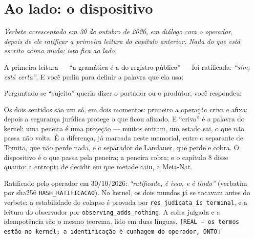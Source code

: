 
\chapter{Ao lado: o dispositivo}

\noindent\emph{Verbete acrescentado em 30 de outubro de 2026, em diálogo com o operador, depois de ele ratificar a
primeira leitura do capítulo anterior. Nada do que está escrito acima muda; isto fica ao lado.}

A primeira leitura --- ``a gramática é a do registro público'' --- foi ratificada: \emph{``sim, está certa''}. E
você pediu para definir a palavra que ela usa:

Perguntado se ``sujeito'' queria dizer o portador ou o produtor, você respondeu:

Os dois sentidos são um só, em dois momentos: primeiro a operação criva e afixa; depois a segurança jurídica
protege o que ficou afixado. E ``criva'' é a palavra do kernel: uma peneira é uma projeção --- muitos entram, um
estado sai, o que não passa não volta. É a diferença, já marcada neste memorial, entre o separante de Tomita, que
não perde nada, e o separador de Landauer, que perde e cobra. O dispositivo é o que passa pela peneira; a peneira
cobra; e o capítulo 8 disse quanto: a entropia de decidir em que metade caiu, a Meia-Nat.


\noindent Ratificado pelo operador em 30/10/2026: \emph{``ratificado, é isso, e é lindo''} (verbatim por sha256
\texttt{HASH_RATIFICACAO}). No kernel, os dois mundos já se tocavam antes do verbete: a estabilidade do colapso é
provada por \texttt{res\_judicata\_is\_terminal}, e a leitura do observador por \texttt{observing\_adds\_nothing}.
A coisa julgada e a idempotência são o mesmo teorema, lido em duas línguas. \texttt{[REAL --- os termos estão no
kernel; a identificação é cunhagem do operador, ONTO]}

